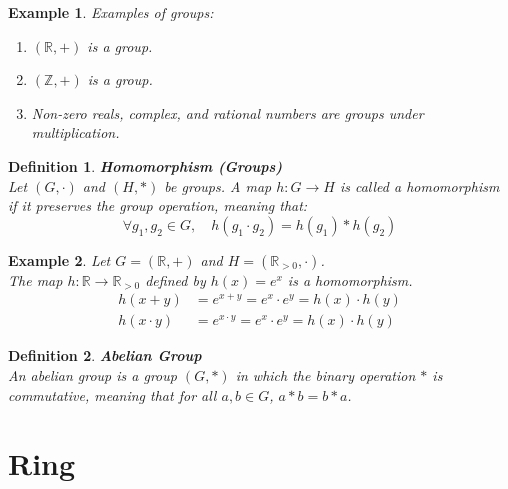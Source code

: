 \documentclass[11pt]{book} %
\newtheorem{definition}{Definition}[section]
\newtheorem*{example*}{Example}
\begin{document}
\begin{example*}
Examples of groups:
\begin{enumerate}
\item \( (\mathbb{R}, +) \) is a group.
\item \( (\mathbb{Z}, +) \) is a group.
\item Non-zero reals, complex, and rational numbers are groups under multiplication.
\end{enumerate}
\end{example*}

\begin{definition}{\textbf{Homomorphism (Groups)}} \\
    Let \( (G, \cdot) \) and \( (H, \ast) \) be groups. A map \( h: G \to H \) is called a homomorphism if it preserves the group operation, meaning that: 
    \begin{equation*}
        \forall g_1, g_2 \in G, \quad h(g_1 \cdot g_2) = h(g_1) \ast h(g_2)
    \end{equation*}
\end{definition}

\begin{example*} Let \( G = (\mathbb{R}, +) \) and \( H = (\mathbb{R}_{>0}, \cdot) \). \\
    The map \( h: \mathbb{R} \to \mathbb{R}_{>0} \) defined by \( h(x) = e^x \) is a homomorphism.
    \begin{align*}
        h(x + y) &= e^{x + y} = e^x \cdot e^y = h(x) \cdot h(y) \\
        h(x \cdot y) &= e^{x \cdot y} = e^x \cdot e^y = h(x) \cdot h(y)
    \end{align*}
\end{example*}


\begin{definition}{\textbf{Abelian Group}} \\
    An abelian group is a group \( (G, *) \) in which the binary operation \( * \) is commutative, 
    meaning that for all \(a, b \in G\), \(a * b = b * a\).
\end{definition}

\section{Ring}
\end{document}
